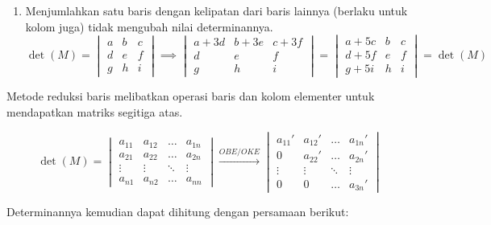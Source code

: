 \begin{enumerate}
            \item Menjumlahkan satu baris dengan kelipatan dari baris lainnya (berlaku untuk kolom juga) tidak mengubah nilai determinannya.
            \[\det(M) = 
            \begin{vmatrix}
                a & b & c \\    
                d & e & f \\
                g & h & i 
            \end{vmatrix} 
            \implies
            \begin{vmatrix}
                a + 3d & b + 3e & c + 3f \\    
                d & e & f \\
                g & h & i 
            \end{vmatrix} 
            = 
            \begin{vmatrix}
                a + 5c & b & c \\    
                d + 5f & e & f \\
                g + 5i & h & i 
            \end{vmatrix} 
            =
            \det(M)
            \]
        \end{enumerate}

        Metode reduksi baris melibatkan operasi baris dan kolom elementer untuk mendapatkan matriks segitiga atas.

        \[ 
            \det(M) = 
            \begin{vmatrix}
                a_{11} & a_{12} & \ldots & a_{1n} \\    
                a_{21} & a_{22} & \ldots & a_{2n} \\
                \vdots & \vdots & \ddots & \vdots \\
                a_{n1} & a_{n2} & \ldots & a_{nn} 
            \end{vmatrix} 
            \stackrel{OBE/OKE}{\longrightarrow}
            \begin{vmatrix}
                a_{11}' & a_{12}'   & \ldots & a_{1n}'   \\    
                0       & a_{22}'   & \ldots & a_{2n}'   \\
                \vdots  & \vdots    & \ddots & \vdots    \\
                0       & 0         & \ldots & a_{3n}' 
            \end{vmatrix} 
        \]

        Determinannya kemudian dapat dihitung dengan persamaan berikut:

